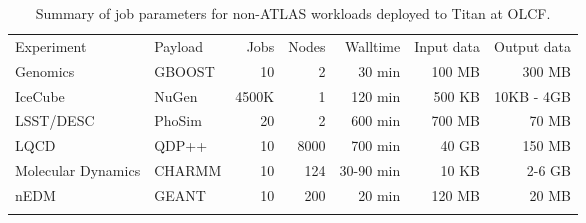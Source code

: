 \begin{table}
\caption{Summary of job parameters for non-ATLAS workloads deployed to Titan at
OLCF.}
\label{tab:beyondhep}       %
\begin{tabular}{llrrrrr}
\hline\noalign{\smallskip}
Experiment & Payload & Jobs & Nodes & Walltime & Input data & Output data \\
\noalign{\smallskip}\hline\noalign{\smallskip}
Genomics           & GBOOST & 10    & 2    & 30 min    & 100 MB & 300 MB \\
IceCube            & NuGen  & 4500K & 1    & 120 min   & 500 KB & 10KB - 4GB \\
LSST/DESC          & PhoSim & 20    & 2    & 600 min   & 700 MB & 70 MB \\
LQCD               & QDP++  & 10    & 8000 & 700 min   & 40 GB  & 150 MB \\
Molecular Dynamics & CHARMM & 10    & 124  & 30-90 min & 10 KB  & 2-6 GB \\
nEDM               & GEANT  & 10    & 200  & 20 min    & 120 MB & 20 MB \\
\noalign{\smallskip}\hline
\end{tabular}
\end{table}


